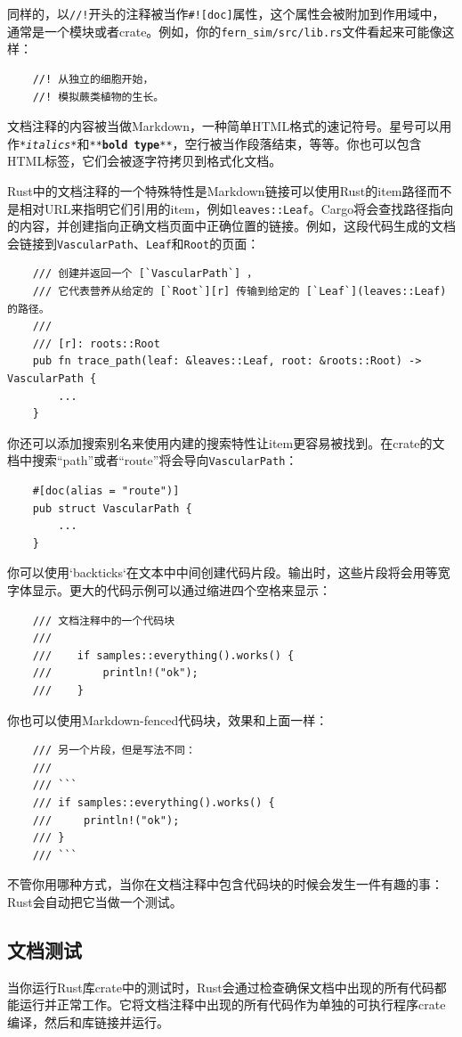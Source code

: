 同样的，以\texttt{//!}开头的注释被当作\texttt{\#![doc]}属性，这个属性会被附加到作用域中，通常是一个模块或者crate。例如，你的\texttt{fern\_sim/src/lib.rs}文件看起来可能像这样：
\begin{verbatim}
    //! 从独立的细胞开始，
    //! 模拟蕨类植物的生长。
\end{verbatim}

文档注释的内容被当做Markdown，一种简单HTML格式的速记符号。星号可以用作\texttt{*\emph{italics}*}和\texttt{**\textbf{bold type}**}，空行被当作段落结束，等等。你也可以包含HTML标签，它们会被逐字符拷贝到格式化文档。

Rust中的文档注释的一个特殊特性是Markdown链接可以使用Rust的item路径而不是相对URL来指明它们引用的item，例如\texttt{leaves::Leaf}。Cargo将会查找路径指向的内容，并创建指向正确文档页面中正确位置的链接。例如，这段代码生成的文档会链接到\texttt{VascularPath}、\texttt{Leaf}和\texttt{Root}的页面：
\begin{verbatim}
    /// 创建并返回一个 [`VascularPath`] ，
    /// 它代表营养从给定的 [`Root`][r] 传输到给定的 [`Leaf`](leaves::Leaf) 的路径。
    ///
    /// [r]: roots::Root
    pub fn trace_path(leaf: &leaves::Leaf, root: &roots::Root) -> VascularPath {
        ...
    }
\end{verbatim}

你还可以添加搜索别名来使用内建的搜索特性让item更容易被找到。在crate的文档中搜索“path”或者“route”将会导向\texttt{VascularPath}：
\begin{verbatim}
    #[doc(alias = "route")]
    pub struct VascularPath {
        ...
    }
\end{verbatim}

你可以使用`backticks`在文本中中间创建代码片段。输出时，这些片段将会用等宽字体显示。更大的代码示例可以通过缩进四个空格来显示：
\begin{verbatim}
    /// 文档注释中的一个代码块
    ///
    ///    if samples::everything().works() {
    ///        println!("ok");
    ///    }
\end{verbatim}
你也可以使用Markdown-fenced代码块，效果和上面一样：
\begin{verbatim}
    /// 另一个片段，但是写法不同：
    /// 
    /// ```
    /// if samples::everything().works() {
    ///     println!("ok");
    /// }
    /// ```
\end{verbatim}

不管你用哪种方式，当你在文档注释中包含代码块的时候会发生一件有趣的事：Rust会自动把它当做一个测试。

\subsection{文档测试}
当你运行Rust库crate中的测试时，Rust会通过检查确保文档中出现的所有代码都能运行并正常工作。它将文档注释中出现的所有代码作为单独的可执行程序crate编译，然后和库链接并运行。

